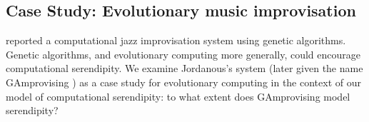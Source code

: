 
\subsection{Case Study: Evolutionary music improvisation} \label{sec:priorart}

 reported a computational jazz improvisation system using genetic algorithms. Genetic algorithms, and evolutionary computing more generally, could encourage computational serendipity. We examine Jordanous's system (later given the name {\sf GAmprovising} \cite{jordanous:12}) as a case study for evolutionary computing in the context of our model of computational serendipity: to what extent does {\sf GAmprovising} model serendipity?

